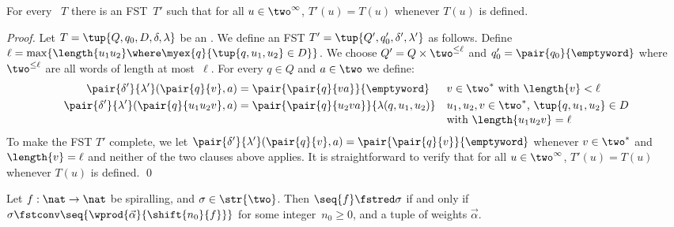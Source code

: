 \begin{lemma}\label{lem:LFST2FST}
  For every \lfst~$T$ there is an FST~$T'$ such that 
  for all $u \in \two^\infty$, 
  $T'(u) = T(u)$ whenever $T(u)$ is defined.
\end{lemma}
\begin{proof}Let $T = \tup{Q,q_0,D,\delta,\lambda}$ be an \lfst. 
  We define an FST $T' = \tup{Q',q'_0,\delta',\lambda'}$ as follows.
  Define $\ell = \max \{\length{u_1u_2} \where \myex{q}{\tup{q,u_1,u_2} \in D} \}$.
  We choose $Q' = Q \times \two^{\le \ell}$ and $q'_0 = \pair{q_0}{\emptyword}$ 
  where $\two^{\le \ell}$ are all words of length at most~$\ell$.
  For every $q\in Q$ and $a \in \two$ we define:
  \begin{align*}
    \pair{\delta'}{\lambda'}(\pair{q}{v},a) &= \pair{\pair{q}{va}}{\emptyword} && \text{$v \in \two^*$ with $\length{v} < \ell$}\\
    \pair{\delta'}{\lambda'}(\pair{q}{u_1u_2v},a) &= \pair{\pair{q}{u_2va}}{\lambda(q,u_1,u_2)} && \text{$u_1,u_2,v \in \two^*$, $\tup{q,u_1,u_2} \in D$}\\[-.5ex]
     &&& \text{with $\length{u_1u_2v} = \ell$}
  \end{align*}
  To make the FST $T'$ complete, we let $\pair{\delta'}{\lambda'}(\pair{q}{v},a) = \pair{\pair{q}{v}}{\emptyword}$ whenever $v \in \two^*$ and $\length{v} = \ell$
  and neither of the two clauses above applies.
  It is straightforward to verify that 
  for all $u \in \two^\infty$, 
  $T'(u) = T(u)$ whenever $T(u)$ is defined.
  \qed
\end{proof}

\begin{theorem}\label{thm:transducts}
  Let $f : \nat \to \nat$ be spiralling, and $\sigma \in \str{\two}$.
  Then $\seq{f} \fstred \sigma$
  if and only if 
  $\sigma \fstconv \seq{\wprod{\vec{\alpha}}{\shift{n_0}{f}}}$
  for some integer~$n_0 \ge 0$, and a tuple of weights $\vec{\alpha}$.
\end{theorem}

